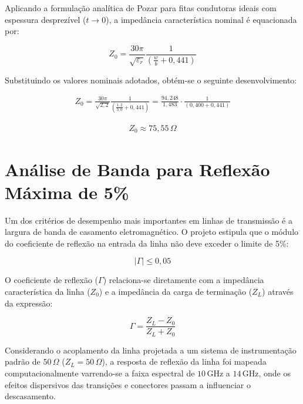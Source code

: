 \documentclass[12pt,a4paper]{report}
\begin{document}
Aplicando a formulação analítica de Pozar para fitas condutoras ideais com espessura desprezível ($t \to 0$), a impedância característica nominal é equacionada por:

\begin{equation}
\boxed{
Z_0 = \frac{30\pi}{\sqrt{\varepsilon_r}}\frac{1}{\left(\frac{w}{b}+0,441\right)}
}
\end{equation}

Substituindo os valores nominais adotados, obtém-se o seguinte desenvolvimento:

\begin{align*}
Z_0 = 
\frac{30\pi}{\sqrt{2,2}}\frac{1}{\left(\frac{1,2}{3,0}+0,441\right)} = \frac{94,248}{1,483} \cdot \frac{1}{(0,400 + 0,441)}
\end{align*}

\begin{align*}
\boxed{
Z_0 \approx 75,55\,\Omega
}
\end{align*}

\newpage

\section{Análise de Banda para Reflexão Máxima de 5\%}

Um dos critérios de desempenho mais importantes em linhas de transmissão é a largura de banda de casamento eletromagnético. O projeto estipula que o módulo do coeficiente de reflexão na entrada da linha não deve exceder o limite de 5\%:

\begin{equation}
\boxed{
|\Gamma| \le 0,05
}
\end{equation}

O coeficiente de reflexão ($\Gamma$) relaciona-se diretamente com a impedância característica da linha ($Z_0$) e a impedância da carga de terminação ($Z_L$) através da expressão:

\begin{equation}
\boxed{
\Gamma = \frac{Z_L - Z_0}{Z_L + Z_0}
}
\end{equation}

Considerando o acoplamento da linha projetada a um sistema de instrumentação padrão de $50\,\Omega$ ($Z_L = 50\,\Omega$), a resposta de reflexão da linha foi mapeada computacionalmente varrendo-se a faixa espectral de $10\,\text{GHz}$ a $14\,\text{GHz}$, onde os efeitos dispersivos das transições e conectores passam a influenciar o descasamento.
\end{document}
